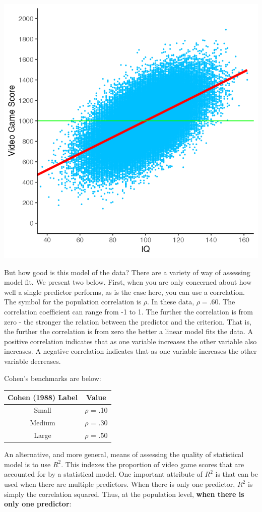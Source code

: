 \documentclass[
]{krantz}
\begin{document}
\includegraphics[width=0.7\linewidth]{ch_correlation/images/pop_graph_iq_line}

But how good is this model of the data? There are a variety of way of assessing model fit. We present two below. First, when you are only concerned about how well a single predictor performs, as is the case here, you can use a correlation. The symbol for the population correlation is \(\rho\). In these data, \(\rho = .60\). The correlation coefficient can range from -1 to 1. The further the correlation is from zero - the stronger the relation between the predictor and the criterion. That is, the further the correlation is from zero the better a linear model fits the data. A positive correlation indicates that as one variable increases the other variable also increases. A negative correlation indicates that as one variable increases the other variable decreases.

Cohen's benchmarks are below:

\begin{longtable}[]{@{}cc@{}}
\toprule
Cohen (1988) Label & Value \\
\midrule
\endhead
Small & \(\rho\) = .10 \\
Medium & \(\rho\) = .30 \\
Large & \(\rho\) = .50 \\
\bottomrule
\end{longtable}

An alternative, and more general, means of assessing the quality of statistical model is to use \(R^2\). This indexes the proportion of video game scores that are accounted for by a statistical model. One important attribute of \(R^2\) is that can be used when there are multiple predictors. When there is only one predictor, \(R^2\) is simply the correlation squared. Thus, at the population level, \textbf{when there is only one predictor}:
\end{document}
